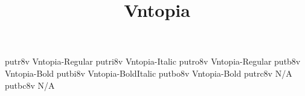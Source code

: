\documentclass[test]{vnsample}
\title{Vntopia}
\begin{document}
\begin{shortsample}
  {putr8v}   {Vntopia-Regular}
 {putri8v}  {Vntopia-Italic}
 {putro8v}  {Vntopia-Regular}
  {putb8v}   {Vntopia-Bold}
 {putbi8v}  {Vntopia-BoldItalic}
 {putbo8v}  {Vntopia-Bold}
 {putrc8v}  {N/A}
 {putbc8v}  {N/A}
\end{shortsample}
\end{document}
